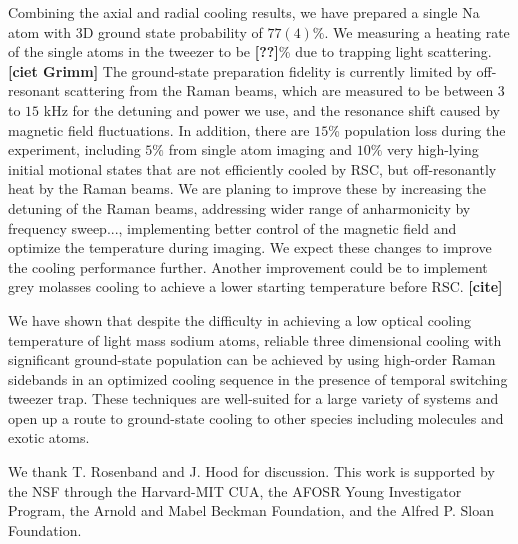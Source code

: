 \documentclass[aps,prl,twocolumn,groupedaddress]{revtex4-1}
\renewcommand{\fxnote}[1]{{\textbf{[#1]}}}
\begin{document}
Combining the axial and radial cooling results,
we have prepared a single Na atom with 3D ground state probability of $77(4)\%$.
We measuring a heating rate of the single atoms in the tweezer to be \fxnote{??}\%
due to trapping light scattering.\fxnote{ciet Grimm}
The ground-state preparation fidelity is currently limited by off-resonant scattering
from the Raman beams,
which are measured to be between $3$ to $15$ kHz for the detuning and power we use,
and the resonance shift caused by magnetic field fluctuations.
In addition, there are $15$\% population loss during the experiment,
including $5\%$ from single atom imaging and  $10\%$ very high-lying initial motional states
that are not efficiently cooled by RSC, but off-resonantly heat by the Raman beams.
We are planing to improve these by increasing the detuning of the Raman beams,
addressing wider range of anharmonicity by frequency sweep...,
implementing better control of the magnetic field and optimize the temperature during imaging.
We expect these changes to improve the cooling performance further.
Another improvement could be to implement grey molasses cooling to achieve
a lower starting temperature before RSC. \fxnote{cite}

We have shown that despite the difficulty in achieving a low optical cooling temperature
of light mass sodium atoms, reliable three dimensional cooling
with significant ground-state population can be achieved by using high-order Raman sidebands
in an optimized cooling sequence in the presence of temporal switching tweezer trap.
These techniques are well-suited for a large variety of systems
and open up a route to ground-state cooling to other species including molecules and exotic atoms.

We thank T. Rosenband and J. Hood for discussion.
This work is supported by the NSF through the Harvard-MIT CUA,
the AFOSR Young Investigator Program, the Arnold and Mabel Beckman Foundation,
and the Alfred P. Sloan Foundation.



\end{document}
